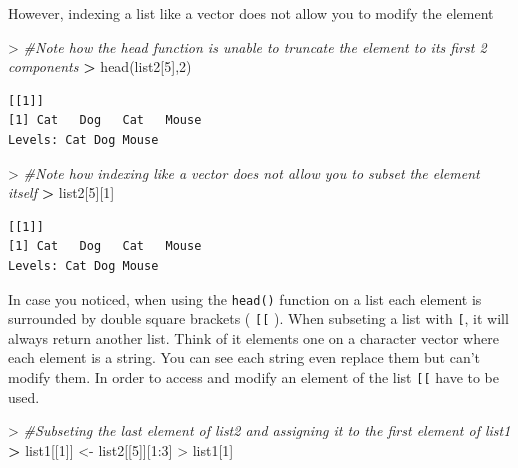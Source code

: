 \documentclass[
]{book}
\newenvironment{Shaded}{\begin{snugshade}}{\end{snugshade}}
\newcommand{\CommentTok}[1]{\textcolor[rgb]{0.56,0.35,0.01}{\textit{#1}}}
\newcommand{\DecValTok}[1]{\textcolor[rgb]{0.00,0.00,0.81}{#1}}
\newcommand{\ErrorTok}[1]{\textcolor[rgb]{0.64,0.00,0.00}{\textbf{#1}}}
\newcommand{\FunctionTok}[1]{\textcolor[rgb]{0.00,0.00,0.00}{#1}}
\newcommand{\NormalTok}[1]{#1}
\newcommand{\OtherTok}[1]{\textcolor[rgb]{0.56,0.35,0.01}{#1}}
\newcommand{\SpecialCharTok}[1]{\textcolor[rgb]{0.00,0.00,0.00}{#1}}
\theoremstyle{definition}
\theoremstyle{definition}
\theoremstyle{definition}
\theoremstyle{definition}
\theoremstyle{remark}
\begin{document}
However, indexing a list like a vector does not allow you to modify the element

\begin{Shaded}
\begin{Highlighting}[]
\SpecialCharTok{\textgreater{}} \CommentTok{\#Note how the head function is unable to truncate the element to its first 2 components}
\ErrorTok{\textgreater{}} \FunctionTok{head}\NormalTok{(list2[}\DecValTok{5}\NormalTok{],}\DecValTok{2}\NormalTok{)}
\end{Highlighting}
\end{Shaded}

\begin{verbatim}
[[1]]
[1] Cat   Dog   Cat   Mouse
Levels: Cat Dog Mouse
\end{verbatim}

\begin{Shaded}
\begin{Highlighting}[]
\SpecialCharTok{\textgreater{}} \CommentTok{\#Note how indexing like a vector does not allow you to subset the element itself}
\ErrorTok{\textgreater{}}\NormalTok{ list2[}\DecValTok{5}\NormalTok{][}\DecValTok{1}\NormalTok{]}
\end{Highlighting}
\end{Shaded}

\begin{verbatim}
[[1]]
[1] Cat   Dog   Cat   Mouse
Levels: Cat Dog Mouse
\end{verbatim}

In case you noticed, when using the \texttt{head()} function on a list each element is surrounded by double
square brackets ( \texttt{{[}{[}} ). When subseting a list with \texttt{{[}}, it will always return another list. Think of it elements one on a
character vector where each element is a string. You can see each string even replace them but can't modify them. In order
to access and modify an element of the list \texttt{{[}{[}} have to be used.

\begin{Shaded}
\begin{Highlighting}[]
\SpecialCharTok{\textgreater{}} \CommentTok{\#Subseting the last element of list2 and assigning it to the first element of list1}
\ErrorTok{\textgreater{}}\NormalTok{ list1[[}\DecValTok{1}\NormalTok{]] }\OtherTok{\textless{}{-}}\NormalTok{ list2[[}\DecValTok{5}\NormalTok{]][}\DecValTok{1}\SpecialCharTok{:}\DecValTok{3}\NormalTok{]}
\SpecialCharTok{\textgreater{}}\NormalTok{ list1[}\DecValTok{1}\NormalTok{]}
\end{Highlighting}
\end{Shaded}
\end{document}
